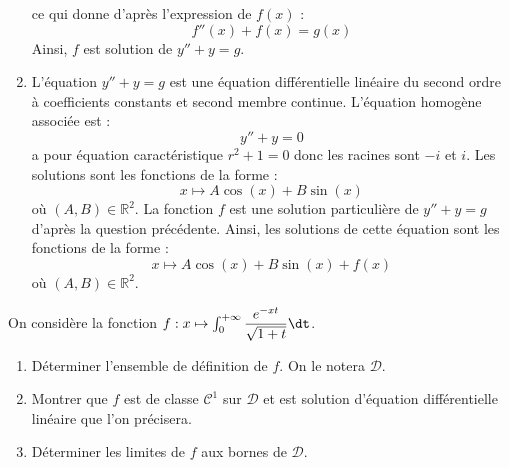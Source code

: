 \documentclass[a4paper,10pt]{report}
\begin{document}
\begin{enumerate}
ce qui donne d'après l'expression de $f(x)$ :
$$ f''(x)+f(x) = g(x)$$
Ainsi, $f$ est solution de $y''+y=g$.
\item L'équation $y''+y=g$ est une équation différentielle linéaire du second ordre à coefficients constants et second membre continue. L'équation homogène associée est :
$$ y''+y=0$$
a pour équation caractéristique $r^2+1=0$ donc les racines sont $-i$ et $i$. Les solutions sont les fonctions de la forme :
$$ x \mapsto A \cos(x) + B \sin(x)$$
où $(A,B) \in \mathbb{R}^2$. La fonction $f$ est une solution particulière de $y''+y=g$ d'après la question précédente. Ainsi, les solutions de cette équation sont les fonctions de la forme :
$$ x \mapsto A \cos(x) + B \sin(x) + f(x)$$
où $(A,B) \in \mathbb{R}^2$.
\end{enumerate}

\begin{Exercice}{} On considère la fonction $f : x \mapsto \int_0^{+ \infty} \dfrac{e^{-xt}}{\sqrt{1+t}} \dt$.
\begin{enumerate}
\item Déterminer l'ensemble de définition de $f$. On le notera $\mathcal{D}$.
\item Montrer que $f$ est de classe $\mathcal{C}^1$ sur $\mathcal{D}$ et est solution d'équation différentielle linéaire que l'on précisera.
\item Déterminer les limites de $f$ aux bornes de $\mathcal{D}$.
\end{enumerate}
\end{Exercice}

\corr 
\end{document}
